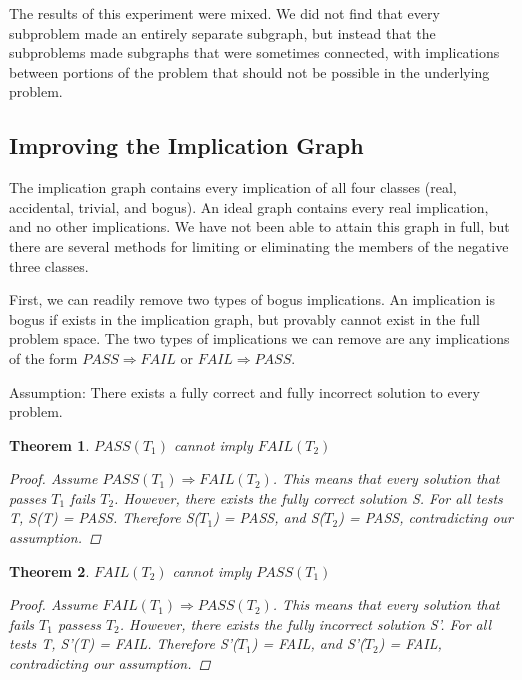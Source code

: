 \documentclass[11pt,twoside]{article}
\newcommand\fail{\mathit{FAIL}}
\newcommand\pass{\mathit{PASS}}
\newtheorem{thm}{Theorem}
\begin{document}
The results of this experiment were mixed. We did not find that every subproblem made an entirely separate subgraph, but instead that the subproblems made subgraphs that were sometimes connected, with implications between portions of the problem that should not be possible in the underlying problem.

\subsection{Improving the Implication Graph}

The implication graph contains every implication of all four classes (real, accidental, trivial, and bogus). An ideal graph contains every real implication, and no other implications. We have not been able to attain this graph in full, but there are several methods for limiting or eliminating the members of the negative three classes.

First, we can readily remove two types of bogus implications. An implication is bogus if exists in the implication graph, but provably cannot exist in the full problem space. The two types of implications we can remove are any implications of the form $\pass\Rightarrow\fail$ or $\fail\Rightarrow\pass$.

Assumption: There exists a fully correct and fully incorrect solution to every problem.


\begin{thm} $\pass(T_1)$ cannot imply $\fail(T_2)$

\begin{proof} Assume $\pass(T_1) \Rightarrow \fail(T_2)$. This means that every solution that passes $T_1$ fails $T_2$. However, there exists the fully correct solution S. For all tests T, S(T) = PASS. Therefore S($T_1$) = PASS, and S($T_2$) = PASS, contradicting our assumption.
\end{proof}
\end{thm}

\begin{thm} $\fail(T_2)$ cannot imply $\pass(T_1)$

\begin{proof} Assume $\fail(T_1) \Rightarrow \pass(T_2)$. This means that every solution that fails $T_1$ passess $T_2$. However, there exists the fully incorrect solution S'. For all tests T, S'(T) = FAIL. Therefore S'($T_1$) = FAIL, and S'($T_2$) = FAIL, contradicting our assumption.
\end{proof}
\end{thm}
\end{document}
